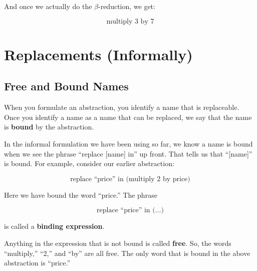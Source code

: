 \documentclass{book}
\numberwithin{equation}{chapter}
\newcommand{\vocab}{\textbf}
\begin{document}
\noindent
And once we actually do the $\beta$-reduction, we get:

\begin{equation}
\text{multiply 3 by 7}
\end{equation}


\chapter{Replacements (Informally)}


\section{Free and Bound Names}

When you formulate an abstraction, you identify a name that is replaceable. Once you identify a name as a name that can be replaced, we say that the name is \vocab{bound} by the abstraction. 

In the informal formulation we have been using so far, we know a name is bound when we see the phrase ``replace [name] in'' up front. That tells us that ``[name]'' is bound. For example, consider our earlier abstraction:

\begin{equation}
\text{replace ``price'' in (multiply 2 by price)}
\end{equation}

\noindent
Here we have bound the word ``price.'' The phrase

\begin{equation}
\text{replace ``price'' in (\ldots)}
\end{equation}

\noindent
is called a \vocab{binding expression}.

Anything in the expression that is not bound is called \vocab{free}. So, the words ``multiply,'' ``2,'' and ``by'' are all free. The only word that is bound in the above abstraction is ``price.''
\end{document}

